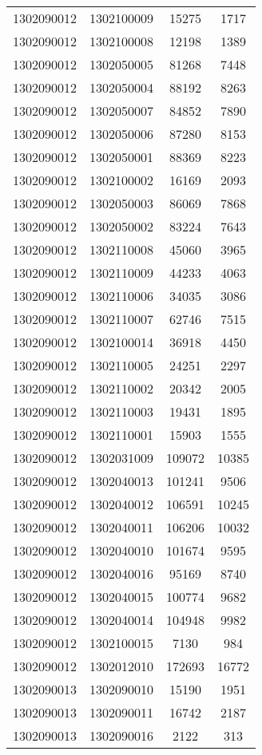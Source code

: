 \begin{longtable}[h]{llcc}
		1302090012 & 1302100009 & 15275 & 1717\\
		1302090012 & 1302100008 & 12198 & 1389\\
		1302090012 & 1302050005 & 81268 & 7448\\
		1302090012 & 1302050004 & 88192 & 8263\\
		1302090012 & 1302050007 & 84852 & 7890\\
		1302090012 & 1302050006 & 87280 & 8153\\
		1302090012 & 1302050001 & 88369 & 8223\\
		1302090012 & 1302100002 & 16169 & 2093\\
		1302090012 & 1302050003 & 86069 & 7868\\
		1302090012 & 1302050002 & 83224 & 7643\\
		1302090012 & 1302110008 & 45060 & 3965\\
		1302090012 & 1302110009 & 44233 & 4063\\
		1302090012 & 1302110006 & 34035 & 3086\\
		1302090012 & 1302110007 & 62746 & 7515\\
		1302090012 & 1302100014 & 36918 & 4450\\
		1302090012 & 1302110005 & 24251 & 2297\\
		1302090012 & 1302110002 & 20342 & 2005\\
		1302090012 & 1302110003 & 19431 & 1895\\
		1302090012 & 1302110001 & 15903 & 1555\\
		1302090012 & 1302031009 & 109072 & 10385\\
		1302090012 & 1302040013 & 101241 & 9506\\
		1302090012 & 1302040012 & 106591 & 10245\\
		1302090012 & 1302040011 & 106206 & 10032\\
		1302090012 & 1302040010 & 101674 & 9595\\
		1302090012 & 1302040016 & 95169 & 8740\\
		1302090012 & 1302040015 & 100774 & 9682\\
		1302090012 & 1302040014 & 104948 & 9982\\
		1302090012 & 1302100015 & 7130 & 984\\
		1302090012 & 1302012010 & 172693 & 16772\\
		1302090013 & 1302090010 & 15190 & 1951\\
		1302090013 & 1302090011 & 16742 & 2187\\
		1302090013 & 1302090016 & 2122 & 313\\

\end{longtable}

